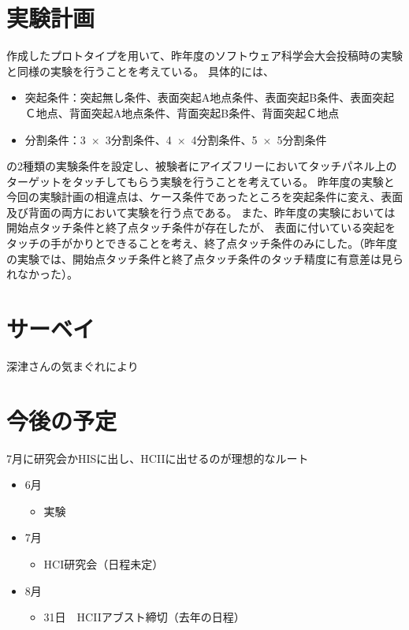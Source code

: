 \documentclass[11pt,a4paper]{jarticle}
\begin{document}
\section{実験計画}
作成したプロトタイプを用いて、昨年度のソフトウェア科学会大会投稿時の実験と同様の実験を行うことを考えている。
具体的には、
\begin{itemize}
	\item 突起条件：突起無し条件、表面突起A地点条件、表面突起B条件、表面突起Ｃ地点、背面突起A地点条件、背面突起B条件、背面突起Ｃ地点
	\item 分割条件：3~$\times$~3分割条件、4~$\times$~4分割条件、5~$\times$~5分割条件
\end{itemize}
の2種類の実験条件を設定し、被験者にアイズフリーにおいてタッチパネル上のターゲットをタッチしてもらう実験を行うことを考えている。
昨年度の実験と今回の実験計画の相違点は、ケース条件であったところを突起条件に変え、表面及び背面の両方において実験を行う点である。
また、昨年度の実験においては開始点タッチ条件と終了点タッチ条件が存在したが、
表面に付いている突起をタッチの手がかりとできることを考え、終了点タッチ条件のみにした。（昨年度の実験では、開始点タッチ条件と終了点タッチ条件のタッチ精度に有意差は見られなかった）。

\section{サーベイ}
深津さんの気まぐれにより

\section{今後の予定}
7月に研究会かHISに出し、HCIIに出せるのが理想的なルート
\begin{itemize}
  \item 6月
  \begin{itemize}
    \item 実験
  \end{itemize}
  \item 7月
  \begin{itemize}
    \item HCI研究会（日程未定）
  \end{itemize}
  \item 8月
  \begin{itemize}
    \item 31日　HCIIアブスト締切（去年の日程）
  \end{itemize}
\end{itemize}


\end{document}
